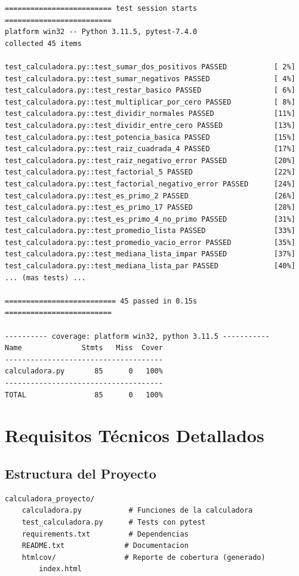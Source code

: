 \documentclass[12pt,a4paper]{article}
\begin{document}
\begin{lstlisting}[caption=Ejemplo de salida de pytest]
========================= test session starts =========================
platform win32 -- Python 3.11.5, pytest-7.4.0
collected 45 items

test_calculadora.py::test_sumar_dos_positivos PASSED           [ 2%]
test_calculadora.py::test_sumar_negativos PASSED               [ 4%]
test_calculadora.py::test_restar_basico PASSED                 [ 6%]
test_calculadora.py::test_multiplicar_por_cero PASSED          [ 8%]
test_calculadora.py::test_dividir_normales PASSED              [11%]
test_calculadora.py::test_dividir_entre_cero PASSED            [13%]
test_calculadora.py::test_potencia_basica PASSED               [15%]
test_calculadora.py::test_raiz_cuadrada_4 PASSED               [17%]
test_calculadora.py::test_raiz_negativo_error PASSED           [20%]
test_calculadora.py::test_factorial_5 PASSED                   [22%]
test_calculadora.py::test_factorial_negativo_error PASSED      [24%]
test_calculadora.py::test_es_primo_2 PASSED                    [26%]
test_calculadora.py::test_es_primo_17 PASSED                   [28%]
test_calculadora.py::test_es_primo_4_no_primo PASSED           [31%]
test_calculadora.py::test_promedio_lista PASSED                [33%]
test_calculadora.py::test_promedio_vacio_error PASSED          [35%]
test_calculadora.py::test_mediana_lista_impar PASSED           [37%]
test_calculadora.py::test_mediana_lista_par PASSED             [40%]
... (mas tests) ...

========================== 45 passed in 0.15s =========================

---------- coverage: platform win32, python 3.11.5 -----------
Name              Stmts   Miss  Cover
-------------------------------------
calculadora.py       85      0   100%
-------------------------------------
TOTAL                85      0   100%
\end{lstlisting}

\newpage

\section{Requisitos Técnicos Detallados}

\subsection{Estructura del Proyecto}

\begin{lstlisting}[caption=Estructura de archivos]
calculadora_proyecto/
    calculadora.py           # Funciones de la calculadora
    test_calculadora.py      # Tests con pytest
    requirements.txt         # Dependencias
    README.txt              # Documentacion
    htmlcov/                # Reporte de cobertura (generado)
        index.html
\end{lstlisting}
\end{document}
